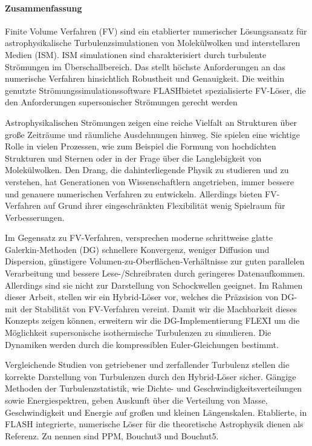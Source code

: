 
\newpage
\paragraph{Zusammenfassung}
Finite Volume Verfahren (FV) sind ein etablierter numerischer Lösungsansatz für
astrophysikalische Turbulenzsimulationen von Molekülwolken und interstellaren
Medien (ISM). ISM simulationen sind charakterisiert durch turbulente Strömungen
im Überschallbereich. Das stellt höchste Anforderungen an das numerische
Verfahren hinsichtlich Robustheit und Genauigkeit. Die weithin genutzte
Strömungssimulationssoftware FLASH\footnotemark bietet spezialisierte FV-Löser,
die den Anforderungen supersonischer Strömungen gerecht werden

Astrophysikalischen Strömungen zeigen eine reiche Vielfalt an Strukturen über
große Zeiträume und räumliche Ausdehnungen hinweg. Sie spielen eine wichtige
Rolle in vielen Prozessen, wie zum Beispiel die Formung von hochdichten
Strukturen und Sternen oder in der Frage über die Langlebigkeit von
Molekülwolken. Den Drang, die dahinterliegende Physik zu studieren und zu
verstehen, hat Generationen von Wissenschaftlern angetrieben, immer bessere und
genauere numerischen Verfahren zu entwickeln. Allerdings bieten FV-Verfahren
auf Grund ihrer eingeschränkten Flexibilität wenig Spielraum für Verbesserungen.

Im Gegensatz zu FV-Verfahren, versprechen moderne schrittweise glatte
Galerkin-Methoden (DG) schnellere Konvergenz, weniger Diffusion und Dispersion,
günstigere Volumen-zu-Oberflächen-Verhältnisse zur guten parallelen
Verarbeitung und bessere Lese-/Schreibraten durch geringeres Datenaufkommen.
Allerdings sind sie nicht zur Darstellung von Schockwellen geeignet. Im Rahmen
dieser Arbeit, stellen wir ein Hybrid-Löser vor, welches die Präzsision von
DG- mit der Stabilität von FV-Verfahren vereint. Damit wir die Machbarkeit
dieses Konzepts zeigen können, erweitern wir die DG-Implementierung FLEXI\footnotemark
um die Möglichkeit supersonische isothermische Turbulenzen zu simulieren.
Die Dynamiken werden durch die kompressiblen Euler-Gleichungen bestimmt.

Vergleichende Studien von getriebener und zerfallender Turbulenz stellen die
korrekte Darstellung von Turbulenzen durch den Hybrid-Löser sicher.  Gängige
Methoden der Turbulenzstatistik, wie Dichte- und Geschwindigkeitsverteilungen
sowie Energiespektren, geben Auskunft über die Verteilung von Masse,
Geschwindigkeit und Energie auf großen und kleinen Längenskalen. Etablierte, in
FLASH integrierte, numerische Löser für die theoretische Astrophysik dienen als
Referenz. Zu nennen sind PPM, Bouchut3 und Bouchut5.

